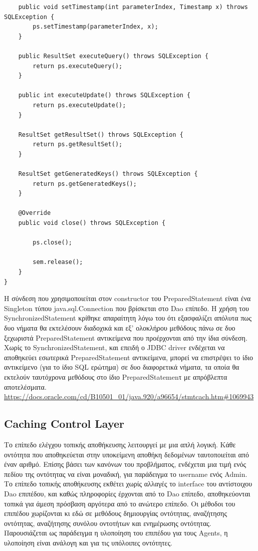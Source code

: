 \documentclass[a4paper,11pt]{article}
\begin{document}
\begin{sloppypar}
\begin{lstlisting}
    public void setTimestamp(int parameterIndex, Timestamp x) throws SQLException {
        ps.setTimestamp(parameterIndex, x);
    }

    public ResultSet executeQuery() throws SQLException {
        return ps.executeQuery();
    }

    public int executeUpdate() throws SQLException {
        return ps.executeUpdate();
    }

    ResultSet getResultSet() throws SQLException {
        return ps.getResultSet();
    }

    ResultSet getGeneratedKeys() throws SQLException {
        return ps.getGeneratedKeys();
    }

    @Override
    public void close() throws SQLException {

        ps.close();

        sem.release();
    }
}

\end{lstlisting}

Η σύνδεση που χρησιμοποιείται στον constructor του PreparedStatement είναι ένα Singleton τύπου java.sql.Connection που βρίσκεται στο Dao επίπεδο. Η χρήση του SynchronizedStatement κρίθηκε απαραίτητη λόγω του ότι εξασφαλίζει απόλυτα πως δυο νήματα θα εκτελέσουν διαδοχικά και εξ' ολοκλήρου μεθόδους πάνω σε δυο ξεχωριστά PreparedStatement αντικείμενα που προέρχονται από την ίδια σύνδεση. Χωρίς το SynchronizedStatement, και επειδή ο JDBC driver ενδέχεται να αποθηκεύει εσωτερικά PreparedStatement αντικείμενα, μπορεί να επιστρέψει το ίδιο αντικείμενο (για το ίδιο SQL ερώτημα) σε δυο διαφορετικά νήματα, τα οποία θα εκτελούν ταυτόχρονα μεθόδους στο ίδιο PreparedStatemenτ με απρόβλεπτα αποτελέσματα. \url{https://docs.oracle.com/cd/B10501_01/java.920/a96654/stmtcach.htm#1069943}


\newpage

\subsection{Caching Control Layer}

Το επίπεδο ελέγχου τοπικής αποθήκευσης λειτουργεί με μια απλή λογική. Κάθε οντότητα που αποθηκεύεται στην υποκείμενη αποθήκη δεδομένων ταυτοποιείται από έναν αριθμό. Επίσης βάσει των κανόνων του προβλήματος, ενδέχεται μια τιμή ενός πεδίου της οντότητας να είναι μοναδική, για παράδειγμα το username ενός Admin. Το επίπεδο τοπικής αποθήκευσης εκθέτει χωρίς αλλαγές το interface του αντίστοιχου Dao επιπέδου, και καθώς πληροφορίες έρχονται από το Dao επίπεδο, αποθηκεύονται τοπικά για άμεση πρόσβαση αργότερα από το ανώτερο επίπεδο. Οι μέθοδοι του επιπέδου χωρίζονται κι εδώ σε μεθόδους δημιουργίας οντότητας, αναζήτησης οντότητας, αναζήτησης συνόλου οντοτήτων και ενημέρωσης οντότητας. Παρουσιάζεται ως παράδειγμα η υλοποίηση του επιπέδου για τους Agents, η υλοποίηση είναι ανάλογη και για τις υπόλοιπες οντότητες.


\end{sloppypar}
\end{document}
